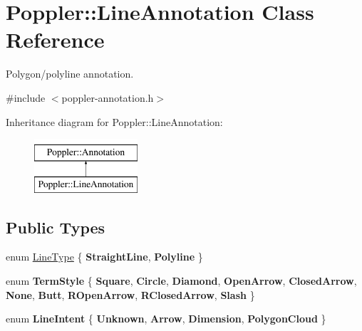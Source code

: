 \hypertarget{class_poppler_1_1_line_annotation}{}\section{Poppler\+:\+:Line\+Annotation Class Reference}
\label{class_poppler_1_1_line_annotation}


Polygon/polyline annotation.  




{\ttfamily \#include $<$poppler-\/annotation.\+h$>$}

Inheritance diagram for Poppler\+:\+:Line\+Annotation\+:\begin{figure}[H]
\begin{center}
\leavevmode
\includegraphics[height=2.000000cm]{class_poppler_1_1_line_annotation}
\end{center}
\end{figure}
\subsection*{Public Types}
\begin{DoxyCompactItemize}
\item 
enum \hyperlink{class_poppler_1_1_line_annotation_a0bcd4ea8f032803eb08e0411f78e0304}{Line\+Type} \{ {\bfseries Straight\+Line}, 
{\bfseries Polyline}
 \}
\item 
\mbox{\label{class_poppler_1_1_line_annotation_a5c74898cd8b04233e8810d0731d1efd1}} 
enum {\bfseries Term\+Style} \{ \newline
{\bfseries Square}, 
{\bfseries Circle}, 
{\bfseries Diamond}, 
{\bfseries Open\+Arrow}, 
\newline
{\bfseries Closed\+Arrow}, 
{\bfseries None}, 
{\bfseries Butt}, 
{\bfseries R\+Open\+Arrow}, 
\newline
{\bfseries R\+Closed\+Arrow}, 
{\bfseries Slash}
 \}
\item 
\mbox{\label{class_poppler_1_1_line_annotation_a486bdaa3cd2d62f996f00eff9dbe19f1}} 
enum {\bfseries Line\+Intent} \{ {\bfseries Unknown}, 
{\bfseries Arrow}, 
{\bfseries Dimension}, 
{\bfseries Polygon\+Cloud}
 \}
\end{DoxyCompactItemize}
